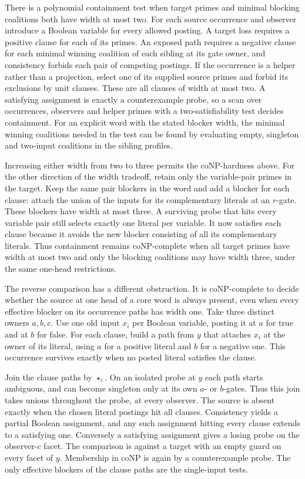 There is a polynomial containment test when target primes
and minimal blocking coalitions both have width at most two.
For each source occurrence and observer introduce a Boolean
variable for every allowed posting. A target loss requires
a positive clause for each of its primes. An exposed path
requires a negative clause for each minimal winning coalition
of each sibling at its gate owner, and consistency forbids
each pair of competing postings. If the occurrence is a helper
rather than a projection, select one of its supplied source
primes and forbid its exclusions by unit clauses. These are
all clauses of width at most two. A satisfying assignment is
exactly a counterexample probe, so a scan over occurrences,
observers and helper primes with a two-satisfiability test
decides containment. For an explicit word with the stated
blocker width, the minimal winning coalitions needed in
the test can be found by evaluating empty, singleton and
two-input coalitions in the sibling profiles.

Increasing either width from two to three permits the
coNP-hardness above. For the other direction of the width
tradeoff, retain only the variable-pair primes in the target.
Keep the same pair blockers in the word and add a blocker
for each clause: attach the union of the inputs for its
complementary literals at an $r$-gate. These blockers have
width at most three. A surviving probe that hits every
variable pair still selects exactly one literal per variable.
It now satisfies each clause because it avoids the new
blocker consisting of all its complementary literals.
Thus containment remains coNP-complete when all target primes
have width at most two and only the blocking coalitions may
have width three, under the same one-head restrictions.

The reverse comparison has a different obstruction. It is
coNP-complete to decide whether the source at one head of a
core word is always present, even when every effective blocker
on its occurrence paths has width one. Take three distinct
owners $a,b,c$. Use one old input $x_i$ per Boolean variable,
posting it at $a$ for true and at $b$ for false. For each
clause, build a path from $y$ that attaches $x_i$ at the
owner of its literal, using $a$ for a positive literal and
$b$ for a negative one. This occurrence survives exactly
when no posted literal satisfies the clause.

Join the clause paths by $\star_c$. On an isolated probe at
$y$ each path starts ambiguous, and can become singleton
only at its own $a$- or $b$-gates. Thus this join takes unions
throughout the probe, at every observer. The source is absent
exactly when the chosen literal postings hit all clauses.
Consistency yields a partial Boolean assignment, and any such
assignment hitting every clause extends to a satisfying one.
Conversely a satisfying assignment gives a losing probe on the
observer-$c$ facet. The comparison is against a target with
an empty guard on every facet of $y$. Membership in coNP is
again by a counterexample probe. The only effective blockers
of the clause paths are the single-input tests.

